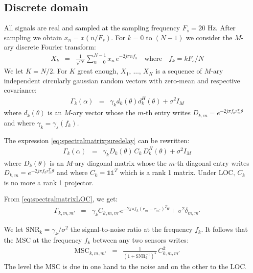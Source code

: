 \documentclass[a4paper, 12pt]{report}
\newcommand{\diag}[1]{\mathrm{diag}\left( #1 \right)}
\def\SNR{\mathrm{SNR}}
\def\MSC{\mathrm{MSC}}
\begin{document}
\subsection{Discrete domain}

All signals are real and sampled at the sampling frequency  $F_{s}=20$ Hz. After sampling we obtain $x_{n}=x(n/F_{s})$. For $k=0$ to $(N-1)$ we consider the $M$-ary discrete Fourier transform:
 \begin{eqnarray*}
 X_{k}&=&\frac{1}{\sqrt{N}}\sum_{n=0}^{N-1}x_{n}\,e^{-2j\pi n f_{k}}
    \quad\mathrm{where}\quad
 f_{k}=kF_{s}/N
 \end{eqnarray*}
We let $K=N/2$.
For $K$ great enough, $X_{1}$, $\ldots$, $X_{K}$ is a sequence of  $M$-ary independent circularly gaussian random vectors with zero-mean and respective covariance:
\begin{eqnarray}
\label{eq:spectralmatrixpuredelay}
\Gamma_{k}(\alpha)&=&\gamma_{k}d_{k}(\theta)d_{k}^{H}(\theta)+\sigma^{2}I_{M}
\end{eqnarray}
where $d_{k}(\theta)$ is an $M$-ary vector whose the $m$-th entry writes $D_{k,m}=e^{-2j\pi f_{k} r_{m}^{T}\theta }$ and where $\gamma_{k}=\gamma_{s}(f_{k})$.

The expression \eqref{eq:spectralmatrixpuredelay} can be rewritten:
\begin{eqnarray}
\label{eq:spectralmatrixLOC}
\Gamma_{k}(\alpha)&=&\gamma_{k}D_{k}(\theta)\, C_{k}\,D_{k}^{H}(\theta)+\sigma^{2}I_{M}
\end{eqnarray}
where $D_{k}(\theta)$ is an $M$-ary diagonal matrix whose the $m$-th diagonal entry writes $D_{k,m}=e^{-2j\pi f_{k} r_{m}^{T}\theta }$ and where $C_{k}=\mathds{1}\mathds{1}^{T}$ which is a rank 1 matrix. Under LOC, $C_{k}$ is no more a rank 1 projector. 

From \eqref{eq:spectralmatrixLOC}, we get:
\begin{eqnarray*}
 \Gamma_{k,m,m'}&=& \gamma_{k}C_{k,m,m'}e^{-2j\pi f_{k} (r_{m}-r_{m'})^{T}\theta }+\sigma^{2}\delta_{m,m'}
\end{eqnarray*}


We let $\SNR_{k}=\gamma_{k}/\sigma^2$ the signal-to-noise ratio at the frequency $f_{k}$. It follows that the MSC at the frequency $f_{k}$  between any two sensors writes:
\begin{eqnarray}
\label{eq:MSCgeneralmodel}
 \MSC_{k,m,m'}&=& \frac{1}{(1+\SNR_{k}^{-1})^2}\,C_{k,m,m'}^{2}
\end{eqnarray}
The level the MSC  is due in one hand to the noise and on the other to the LOC.
\end{document}
